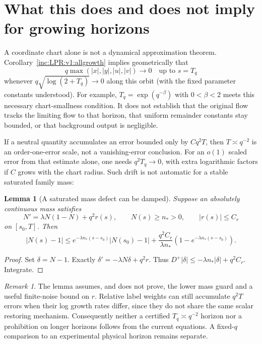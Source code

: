 \documentclass[11pt]{article}
\numberwithin{equation}{section}
\newtheorem{lemma}[theorem]{Lemma}
\theoremstyle{remark}\newtheorem{remark}[theorem]{Remark}
\begin{document}
\section{What this does and does not imply for growing horizons}
\label{inc:LPR:v1:horizons}
A coordinate chart alone is not a dynamical approximation theorem.
Corollary~\ref{inc:LPR:v1:allgrowth} implies geometrically that
\[
 q\max(|x|,|y|,|u|,|v|)\to0\quad\text{up to }s=T_q
\]
whenever $q\sqrt{\log(2+T_q)}\to0$ along this orbit (with the fixed
parameter constants understood). For example, $T_q=\exp(q^{-\beta})$
with $0<\beta<2$ meets this necessary chart-smallness condition.
It does not establish that the original flow tracks the limiting flow to
that horizon, that uniform remainder constants stay bounded, or that
background output is negligible.

If a neutral quantity accumulates an error bounded only by $Cq^2T$,
then $T\asymp q^{-2}$ is an order-one-error scale, not a vanishing-error
conclusion. For an $o(1)$ scaled error from that estimate alone, one needs
$q^2T_q\to0$, with extra logarithmic factors if $C$ grows with the chart
radius. Such drift is not automatic for a stable saturated family mass:

\begin{lemma}[A saturated mass defect can be damped]
\label{inc:LPR:v1:massdamping}
Suppose an absolutely continuous mass satisfies
\[
 N'=\lambda N(1-N)+q^2r(s),\qquad N(s)\ge n_*>0,
 \qquad |r(s)|\le C_r
\]
on $[s_0,T]$. Then
\[
 |N(s)-1|\le e^{-\lambda n_*(s-s_0)}|N(s_0)-1|
       +\frac{q^2C_r}{\lambda n_*}
          (1-e^{-\lambda n_*(s-s_0)}).
\]
\end{lemma}
\begin{proof}
Set $\delta=N-1$. Exactly $\delta'=-\lambda N\delta+q^2r$.
Thus $D^+|\delta|\le-\lambda n_*|\delta|+q^2C_r$. Integrate.
\end{proof}

\begin{remark}
The lemma assumes, and does not prove, the lower mass guard and a useful
finite-noise bound on $r$. Relative label weights can still accumulate
$q^2T$ errors when their log growth rates differ, since they do not share
the same scalar restoring mechanism. Consequently neither a certified
$T_q\asymp q^{-2}$ horizon nor a prohibition on longer horizons follows
from the current equations. A fixed-$q$ comparison to an experimental
physical horizon remains separate.
\end{remark}
\end{document}

